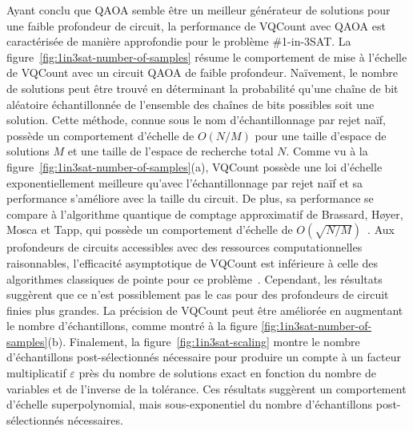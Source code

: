 Ayant conclu que QAOA semble être un meilleur générateur de solutions pour une faible profondeur de circuit, la performance de VQCount avec QAOA est caractérisée de manière approfondie pour le problème \#1-in-3SAT. La figure~\ref{fig:1in3sat-number-of-samples} résume le comportement de mise à l'échelle de VQCount avec un circuit QAOA de faible profondeur. Naïvement, le nombre de solutions peut être trouvé en déterminant la probabilité qu'une chaîne de bit aléatoire échantillonnée de l'ensemble des chaînes de bits possibles soit une solution. Cette méthode, connue sous le nom d'échantillonnage par rejet naïf, possède un comportement d'échelle de $O(N/M)$ pour une taille d'espace de solutions $M$ et une taille de l'espace de recherche total $N$. Comme vu à la figure~\ref{fig:1in3sat-number-of-samples}(a), VQCount possède une loi d'échelle exponentiellement meilleure qu'avec l'échantillonnage par rejet naïf et sa performance s'améliore avec la taille du circuit. De plus, sa performance se compare à l'algorithme quantique de comptage approximatif de Brassard, H\o yer, Mosca et Tapp, qui possède un comportement d'échelle de $O(\sqrt{N/M})$~\cite{brassardQuantumAmplitudeAmplification2002}. Aux profondeurs de circuits accessibles avec des ressources computationnelles raisonnables, l'efficacité asymptotique de VQCount est inférieure à celle des algorithmes classiques de pointe pour ce problème~\cite{kourtisFastCountingTensor2019}. Cependant, les résultats suggèrent que ce n'est possiblement pas le cas pour des profondeurs de circuit finies plus grandes. La précision de VQCount peut être améliorée en augmentant le nombre d'échantillons, comme montré à la figure \ref{fig:1in3sat-number-of-samples}(b). Finalement, la figure~\ref{fig:1in3sat-scaling} montre le nombre d'échantillons post-sélectionnés nécessaire pour produire un compte à un facteur multiplicatif $\varepsilon$ près du nombre de solutions exact en fonction du nombre de variables et de l'inverse de la tolérance. Ces résultats suggèrent un comportement d'échelle superpolynomial, mais sous-exponentiel du nombre d'échantillons post-sélectionnés nécessaires. 

